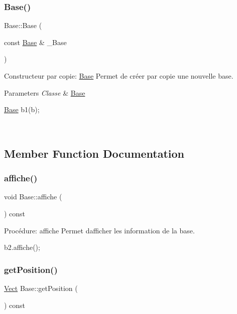 \subsubsection{\texorpdfstring{Base()}{Base()}\hspace{0.1cm}{\footnotesize\ttfamily [3/3]}}
{\footnotesize\ttfamily Base\+::\+Base (\begin{DoxyParamCaption}\item[{const \hyperlink{classBase}{Base} \&}]{\+\_\+\+Base }\end{DoxyParamCaption})}



Constructeur par copie\+: \hyperlink{classBase}{Base} Permet de créer par copie une nouvelle base. 


\begin{DoxyParams}{Parameters}
{\em Classe} & \hyperlink{classBase}{Base} 
\begin{DoxyCode}
\hyperlink{classBase}{Base} b1(b);
\end{DoxyCode}
 \\
\hline
\end{DoxyParams}


\subsection{Member Function Documentation}
\mbox{\label{classBase_a75f96a51a09c27378c609ebb328e24eb}} 
\subsubsection{\texorpdfstring{affiche()}{affiche()}}
{\footnotesize\ttfamily void Base\+::affiche (\begin{DoxyParamCaption}{ }\end{DoxyParamCaption}) const}



Procédure\+: affiche Permet d\textquotesingle{}afficher les information de la base. 


\begin{DoxyCode}
b2.affiche();
\end{DoxyCode}
 \mbox{\label{classBase_ab4e98e615e7659abd847a41ca40c11cc}} 
\subsubsection{\texorpdfstring{get\+Position()}{getPosition()}}
{\footnotesize\ttfamily \hyperlink{classVect}{Vect} Base\+::get\+Position (\begin{DoxyParamCaption}{ }\end{DoxyParamCaption}) const}



